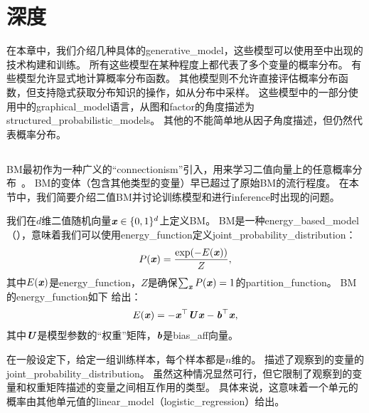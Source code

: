\chapter{深度}
\label{chap:deep_generative_models}
在本章中，我们介绍几种具体的\gls{generative_model}，这些模型可以使用至中出现的技术构建和训练。
所有这些模型在某种程度上都代表了多个变量的概率分布。
有些模型允许显式地计算概率分布函数。
其他模型则不允许直接评估概率分布函数，但支持隐式获取分布知识的操作，如从分布中采样。
这些模型中的一部分使用中的\gls{graphical_model}语言，从图和\gls{factor}的角度描述为\gls{structured_probabilistic_models}。
其他的不能简单地从因子角度描述，但仍然代表概率分布。


\section{}
\label{sec:boltzmann_machines}
\gls{BM}最初作为一种广义的``\gls{connectionism}''引入，用来学习二值向量上的任意概率分布~\citep{Fahlman83,Ackley85,Hinton-Boltzmann,Hinton86a}。
\gls{BM}的变体（包含其他类型的变量）早已超过了原始\gls{BM}的流行程度。
在本节中，我们简要介绍二值\gls{BM}并讨论训练模型和进行\gls{inference}时出现的问题。

我们在$d$维二值随机向量$\boldsymbol{\mathit{x}} \in \{0, 1\}^d$上定义\gls{BM}。
\gls{BM}是一种\gls{energy_based_model}（），意味着我们可以使用\gls{energy_function}定义\gls{joint_probability_distribution}：
\begin{align}\label{eq:201px}
 P(\boldsymbol{\mathit{x}}) = \frac{\exp(-E(\boldsymbol{\mathit{x}}))}{Z},
\end{align}
其中$E(\boldsymbol{\mathit{x}})$是\gls{energy_function}，$Z$是确保$\sum_{\boldsymbol{\mathit{x}}} P(\boldsymbol{\mathit{x}})=1$的\gls{partition_function}。
\gls{BM}的\gls{energy_function}如下
给出：
\begin{align}\label{eq:202E}
 E(\boldsymbol{\mathit{x}}) = -\boldsymbol{\mathit{x}}^\top \boldsymbol{\mathit{U}} \boldsymbol{\mathit{x}} - \boldsymbol{\mathit{b}}^\top \boldsymbol{\mathit{x}},
\end{align}
其中$\boldsymbol{\mathit{U}}$是模型参数的``权重''矩阵，$\boldsymbol{\mathit{b}}$是\gls{bias_aff}向量。


在一般设定下，给定一组训练样本，每个样本都是$n$维的。
描述了观察到的变量的\gls{joint_probability_distribution}。
虽然这种情况显然可行，但它限制了观察到的变量和权重矩阵描述的变量之间相互作用的类型。
具体来说，这意味着一个单元的概率由其他单元值的\gls{linear_model}（\gls{logistic_regression}）给出。


